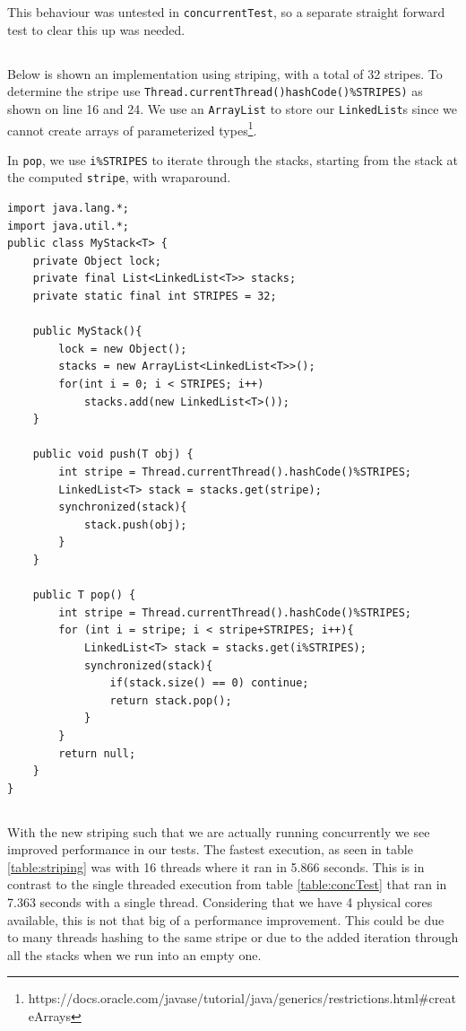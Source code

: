 \documentclass[a5paper]{article}
\begin{document}
This behaviour was untested in \texttt{concurrentTest}, so a separate straight forward test to clear this up was needed.

\subsection{}\label{sec:striping}
Below is shown an implementation using striping, with a total of 32 stripes. To determine the stripe use \texttt{Thread.currentThread()hashCode()\%STRIPES)}
as shown on line 16 and 24. We use an \texttt{ArrayList} to store our \texttt{LinkedList}s since we cannot create arrays of 
parameterized types\footnote{https://docs.oracle.com/javase/tutorial/java/generics/restrictions.html\#createArrays}.

In \texttt{pop}, we use \texttt{i\%STRIPES} to iterate through the stacks, starting from the stack at the computed \texttt{stripe}, with wraparound.

\begin{lstlisting}
import java.lang.*;
import java.util.*;
public class MyStack<T> {
    private Object lock;
    private final List<LinkedList<T>> stacks;
    private static final int STRIPES = 32;

    public MyStack(){
        lock = new Object();
        stacks = new ArrayList<LinkedList<T>>();
        for(int i = 0; i < STRIPES; i++)
            stacks.add(new LinkedList<T>());
    }

    public void push(T obj) {
        int stripe = Thread.currentThread().hashCode()%STRIPES;
        LinkedList<T> stack = stacks.get(stripe);
        synchronized(stack){
            stack.push(obj);
        }
    }

    public T pop() {
        int stripe = Thread.currentThread().hashCode()%STRIPES;
        for (int i = stripe; i < stripe+STRIPES; i++){
            LinkedList<T> stack = stacks.get(i%STRIPES);
            synchronized(stack){
                if(stack.size() == 0) continue;
                return stack.pop();
            }
        }
        return null;
    }
}
\end{lstlisting}

\subsection{}
With the new striping such that we are actually running concurrently we see improved performance in our tests.
The fastest execution, as seen in table \ref{table:striping} was with 16 threads where it ran in 5.866 seconds. This is in contrast
to the single threaded execution from table \ref{table:concTest} that ran in 7.363 seconds with a single thread. Considering that we have
4 physical cores available, this is not that big of a performance improvement. This could be due to many threads hashing to the same stripe or
due to the added iteration through all the stacks when we run into an empty one.
\end{document}

